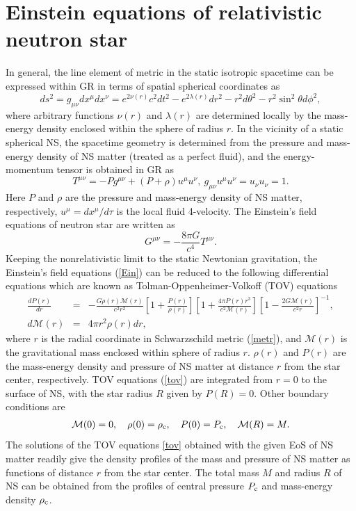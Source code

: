 \section{Einstein equations of relativistic neutron star}%
\label{sec3}
In general, the line element of metric in the static isotropic spacetime can be 
expressed within GR  \citep{glendenning2012compact} in terms of spatial spherical 
coordinates as
\begin{equation}
        ds^2 = g_{\mu\nu}dx^\mu dx^\nu=e^{2\nu(r)}c^2dt^2 - e^{2\lambda(r)}dr^2 - 
				r^2 d\theta^2 - r^2\sin^2\theta d\phi^2, \label{metr}
\end{equation}
where arbitrary functions $\nu(r)$ and $\lambda(r)$ are determined locally by the
mass-energy density enclosed within the sphere of radius $r$. In the vicinity of a 
static spherical NS, the spacetime geometry is determined from the pressure and 
mass-energy density of NS matter (treated as a perfect fluid), and the  
energy-momentum tensor is obtained in \gls{GR} as
\begin{equation}
        T^{\mu\nu}=- Pg^{\mu\nu} + (P+\rho) u^\mu u^\nu,\ 
				g_{\mu\nu}u^\mu u^\nu=u_\nu u_\nu=1.
\end{equation}
Here $P$ and $\rho$ are the pressure and mass-energy density of NS matter, respectively,
$u^\mu = dx^\mu/d\tau$ is the local fluid 4-velocity. The Einstein's field 
equations of neutron star are written as 
\begin{equation}
        G^{\mu\nu} = - \frac{8\pi G}{c^4} T^{\mu\nu}. \label{Ein} 
\end{equation}
Keeping the nonrelativistic limit to the static Newtonian gravitation, the 
Einstein's field equations (\ref{Ein}) can be reduced to the following differential 
equations which are known as Tolman-Oppenheimer-Volkoff (\gls{TOV}) equations 
\citep{glendenning2012compact}
\begin{eqnarray}
\frac{d P(r)}{dr}&=& -\frac{G \rho(r)\mathcal{M}(r)}{c^2 r^2} 
 \left[ 1+\frac{P(r)}{\rho(r)}\right] 
\left[1+\frac{4 \pi P(r) r^3}{c^2 \mathcal{M}(r)} \right] 
\left[ 1-\frac{2G \mathcal{M}(r)}{c^2 r} \right]^{-1}, \nonumber \\
d\mathcal{M}(r) &=& 4\pi r^2 \rho(r)dr, \label{tov} 
\end{eqnarray}
where $r$ is the radial coordinate in Schwarzschild metric (\ref{metr}), and 
$\mathcal{M}(r)$ is the gravitational mass enclosed within sphere of radius $r$. 
$\rho(r)$ and $P(r)$ are the mass-energy density and pressure of NS matter at 
distance $r$ from the star center, respectively. TOV equations (\ref{tov}) are 
integrated from $r=0$ to the surface of NS, with the star radius $R$ given by 
$P(R)=0$. Other boundary conditions are 
\begin{align}
\mathcal{M}(0)=0, \quad \rho(0)=\rho_{\rm c}, \quad P(0)=P_{\rm c},\quad \mathcal{M}(R)=M.   
\end{align}
The solutions of the TOV equations \eqref{tov} obtained with the given \gls{EoS}
of NS matter readily give the density profiles of the mass and pressure of 
\gls{NS} matter as functions of distance $r$ from the star center. The total mass 
$M$ and radius $R$ of NS can be obtained from the profiles of central pressure 
$P_{\rm c}$ and mass-energy density $\rho_{\rm c}$.

